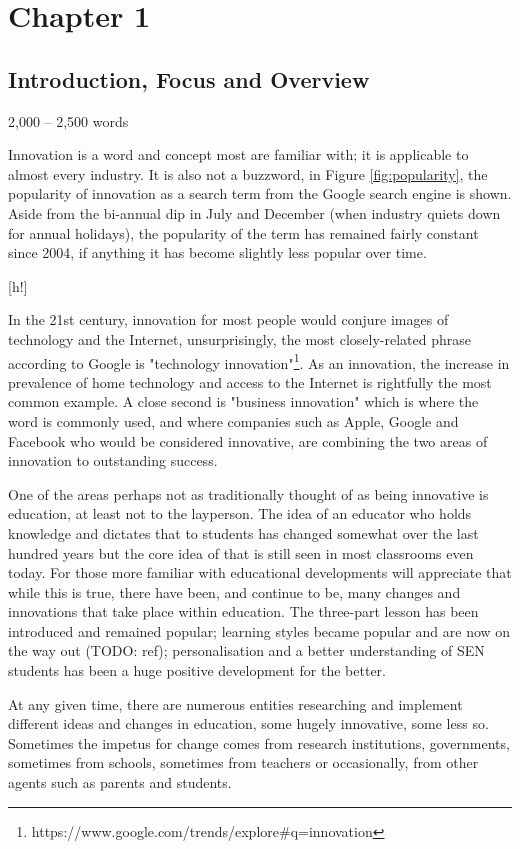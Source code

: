 \section{Chapter 1}
\subsection{Introduction, Focus and Overview}
2,000 – 2,500 words\citep{Frame61:online}

Innovation is a word and concept most are familiar with; it is applicable to almost every industry. It is also not a buzzword, in Figure \ref{fig:popularity}, the popularity of innovation as a search term from the Google search engine is shown. Aside from the bi-annual dip in July and December (when industry quiets down for annual holidays), the popularity of the term has remained fairly constant since 2004, if anything it has become slightly less popular over time.

[h!]

In the 21st century, innovation for most people would conjure images of technology and the Internet, unsurprisingly, the most closely-related phrase according to Google is "technology innovation"\footnote{https://www.google.com/trends/explore\#q=innovation}. As an innovation, the increase in prevalence of home technology and access to the Internet is rightfully the most common example. A close second is "business innovation" which is where the word is commonly used, and where companies such as Apple, Google and Facebook who would be considered innovative, are combining the two areas of innovation to outstanding success.

One of the areas perhaps not as traditionally thought of as being innovative is education, at least not to the layperson. The idea of an educator who holds knowledge and dictates that to students has changed somewhat over the last hundred years but the core idea of that is still seen in most classrooms even today. For those more familiar with educational developments will appreciate that while this is true, there have been, and continue to be, many changes and innovations that take place within education. The three-part lesson has been introduced and remained popular; learning styles became popular and are now on the way out (TODO: ref); personalisation and a better understanding of SEN students has been a huge positive development for the better.

At any given time, there are numerous entities researching and implement different ideas and changes in education, some hugely innovative, some less so. Sometimes the impetus for change comes from research institutions, governments, sometimes from schools, sometimes from teachers or occasionally, from other agents such as parents and students. 

